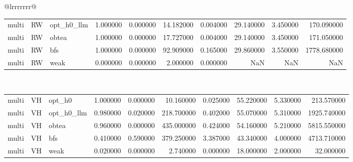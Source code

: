 \begin{table}[ht]
\begin{tabular}{@{}lrrrrrrr@{}}
\begin{tabular}{lllrrrrrrr}
multi & RW & opt_h0_llm & 1.000000 & 0.000000 & 14.182000 & 0.004000 & 29.140000 & 3.450000 & 170.090000 \\
multi & RW & obtea & 1.000000 & 0.000000 & 17.727000 & 0.004000 & 29.140000 & 3.450000 & 171.050000 \\
multi & RW & bfs & 1.000000 & 0.000000 & 92.909000 & 0.165000 & 29.860000 & 3.550000 & 1778.680000 \\
multi & RW & weak & 0.000000 & 0.000000 & 2.000000 & 0.000000 & NaN & NaN & NaN \\
\bottomrule
\end{tabular}
\midrule
{} \\
\begin{tabular}{lllrrrrrrr}
\toprule
\midrule
multi & VH & opt_h0 & 1.000000 & 0.000000 & 10.160000 & 0.025000 & 55.220000 & 5.330000 & 213.570000 \\
multi & VH & opt_h0_llm & 0.980000 & 0.020000 & 218.700000 & 0.402000 & 55.070000 & 5.310000 & 1925.740000 \\
multi & VH & obtea & 0.960000 & 0.000000 & 435.000000 & 0.424000 & 54.160000 & 5.210000 & 5815.550000 \\
multi & VH & bfs & 0.410000 & 0.590000 & 379.250000 & 3.387000 & 43.340000 & 4.000000 & 4713.710000 \\
multi & VH & weak & 0.020000 & 0.000000 & 2.740000 & 0.000000 & 18.000000 & 2.000000 & 32.000000 \\
\bottomrule
\end{tabular}
\midrule
\bottomrule
\end{tabular}
\end{table}
\clearpage
